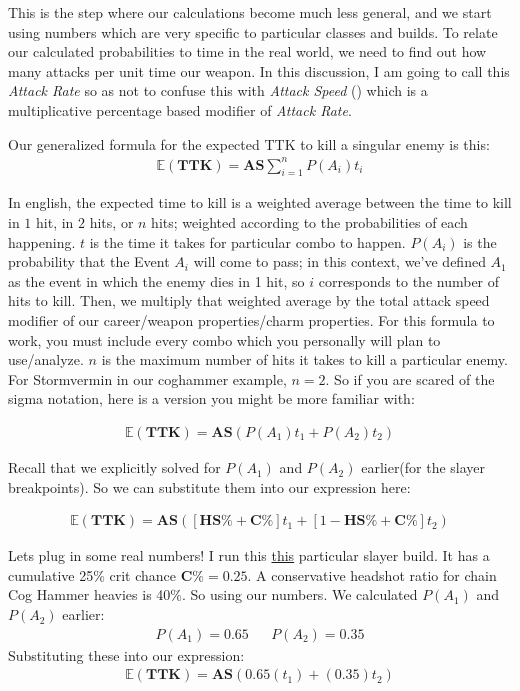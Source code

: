 \documentclass{article}
\begin{document}
This is the step where our calculations become much less general, and we start using numbers which are very specific to particular classes and builds. To relate our calculated probabilities to time in the real world, we need to find out how many attacks per unit time our weapon. In this discussion, I am going to call this \emph{Attack Rate} so as not to confuse this with \emph{Attack Speed} () which is a multiplicative percentage based modifier of \emph{Attack Rate}.

Our generalized formula for the expected TTK to kill a singular enemy is this:
\begin{align*}
\mathbb{E}(\mathbf{TTK}) = \mathbf{AS} \sum_{i=1}^{n} P(A_i) t_i
\end{align*}

In english, the expected time to kill is a weighted average between the time to kill in $1$ hit, in $2$ hits, or $n$ hits; weighted according to the probabilities of each happening. $t$ is the time it takes for particular combo to happen. $P(A_i)$ is the probability that the Event $A_i$ will come to pass; in this context, we've defined $A_1$ as the event in which the enemy dies in 1 hit, so $i$ corresponds to the number of hits to kill. Then, we multiply that weighted average by the total attack speed modifier of our career/weapon properties/charm properties. For this formula to work, you must include every combo which you personally will plan to use/analyze. $n$ is the maximum number of hits it takes to kill a particular enemy. For Stormvermin in our coghammer example, $n=2$. So if you are scared of the sigma notation, here is a version you might be more familiar with:

\begin{align*}
\mathbb{E}(\mathbf{TTK}) = \mathbf{AS} (P(A_1) t_1 + P(A_2) t_2)
\end{align*}

Recall that we explicitly solved for $P(A_1)$ and $P(A_2)$ earlier(for the slayer breakpoints). So we can substitute them into our expression here:

\begin{align*}
\mathbb{E}(\mathbf{TTK}) = \mathbf{AS} ([\mathbf{HS\%} + \mathbf{C\%}] t_1 + [1-\mathbf{HS\%}+ \mathbf{C\%}] t_2)
\end{align*}

Lets plug in some real numbers! I run this \href{https://www.ranalds.gift/build/IKtCgpNH7INsPonDHAHZ/view}{this} particular slayer build. It has a cumulative 25\% crit chance $\mathbf{C\%} = 0.25$. A conservative headshot ratio for chain Cog Hammer heavies is 40\%. So using our numbers. We calculated $P(A_1)$ and $P(A_2)$ earlier:
\begin{align*}
P(A_1) = 0.65 && P(A_2) = 0.35
\end{align*}
Substituting these into our expression:
\begin{align*}
\mathbb{E}(\mathbf{TTK}) = \mathbf{AS} (0.65 (t_1) + (0.35) t_2)
\end{align*}
\end{document}
